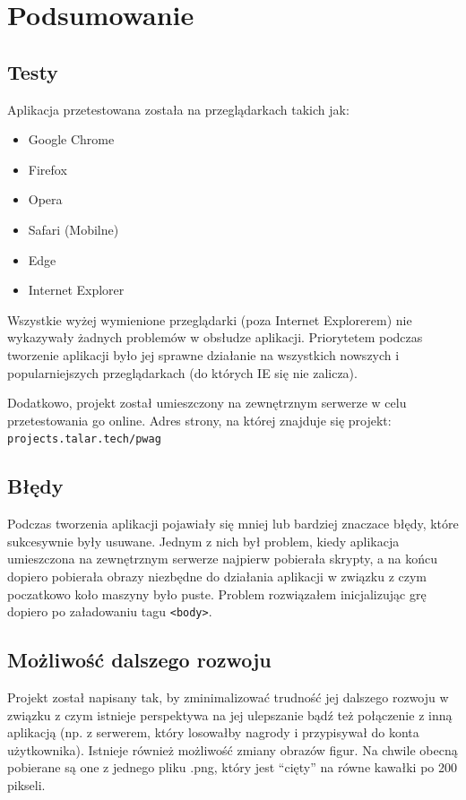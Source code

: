 \documentclass[a4paper,11pt,titlepage]{article}
\begin{document}
\section{Podsumowanie}
\subsection{Testy}
Aplikacja przetestowana została na przeglądarkach takich jak:
\begin{itemize}
	\item Google Chrome
	\item Firefox
	\item Opera
	\item Safari (Mobilne)
	\item Edge
	\item Internet Explorer
\end{itemize}

Wszystkie wyżej wymienione przeglądarki (poza Internet Explorerem) nie wykazywały żadnych problemów w obsłudze aplikacji. Priorytetem podczas tworzenie aplikacji było jej sprawne działanie na wszystkich nowszych i popularniejszych przeglądarkach (do których IE się nie zalicza).

Dodatkowo, projekt został umieszczony na zewnętrznym serwerze w celu przetestowania go online. Adres strony, na której znajduje się projekt: \newline \verb|projects.talar.tech/pwag|

\subsection{Błędy}
Podczas tworzenia aplikacji pojawiały się mniej lub bardziej znaczace błędy, które sukcesywnie były usuwane. Jednym z nich był problem, kiedy aplikacja umieszczona na zewnętrznym serwerze najpierw pobierała skrypty, a na końcu dopiero pobierała obrazy niezbędne do działania aplikacji w związku z czym poczatkowo koło maszyny było puste. Problem rozwiązałem inicjalizując grę dopiero po załadowaniu tagu \verb|<body>|.

\subsection{Możliwość dalszego rozwoju}
Projekt został napisany tak, by zminimalizować trudność jej dalszego rozwoju w związku z czym istnieje perspektywa na jej ulepszanie bądź też połączenie z inną aplikacją (np. z serwerem, który losowałby nagrody i przypisywał do konta użytkownika). Istnieje również możliwość zmiany obrazów figur. Na chwile obecną pobierane są one z jednego pliku .png, który jest ``cięty'' na równe kawałki po 200 pikseli.
\end{document}
